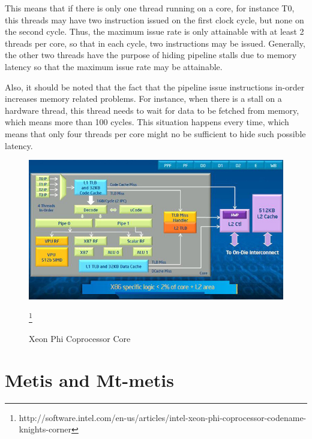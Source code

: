 \documentclass[abstract=on,9pt,twocolumn]{scrartcl}
\begin{document}
This means that if there is only one thread running on a core, for
instance T0, this threads may have two instruction issued on the first
clock cycle, but none on the second cycle. Thus, the maximum issue rate
is only attainable with at least 2 threads per core, so that in each
cycle, two instructions may be issued. Generally, the other two threads
have the purpose of hiding pipeline stalls due to memory latency so that
the maximum issue rate may be attainable.

Also, it should be noted that the fact that the pipeline issue
instructions in-order increases memory related problems. For instance,
when there is a stall on a hardware thread, this thread needs to wait
for data to be fetched from memory, which means more than 100 cycles.
This situation happens every time, which means that only four threads
per core might no be sufficient to hide such possible latency.

\begin{center}
\begin{figure}[htb]
    \includegraphics[width=\columnwidth]{img/phi_arch.jpg}
    \caption{Xeon Phi Coprocessor
    Core}\footnote{http://software.intel.com/en-us/articles/intel-xeon-phi-coprocessor-codename-knights-corner}
    \label{img:phi_arch}
\end{figure}
\end{center}



\section{Metis and Mt-metis}
\end{document}
